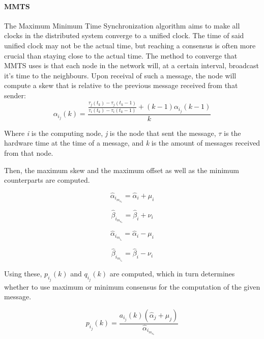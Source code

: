 \documentclass[a4paper,12pt]{article}
\begin{document}
    \paragraph{MMTS} The Maximum Minimum Time Synchronization algorithm aims to make all clocks in the distributed system converge to a unified clock. The time of said unified clock may not be the actual time, but reaching a consensus is often more crucial than staying close to the actual time.
    The method to converge that MMTS uses is that each node in the network will, at a certain interval, broadcast it's time to the neighbours. Upon receival of such a message, the node will compute a skew that is relative to the previous message received from that sender:
    \begin{equation}
        \alpha_i_j(k) = \frac{\frac{\tau_j(t_k) - \tau_j(t_k - 1)}{\tau_i(t_k)-\tau_i(t_k-1)} + (k-1)\alpha_i_j(k-1)}{k}
    \end{equation}

    Where \textit{i} is the computing node, \textit{j} is the node that sent the message, \textit{$\tau$} is the hardware time at the time of a message, and \textit{k} is the amount of messages received from that node.
    
    Then, the maximum skew and the maximum offset as well as the minimum counterparts are computed.
    
    \begin{equation}
        \hat{\alpha}_i_m_a_x = \hat{\alpha}_i + \mu_i
    \end{equation}
    
    \begin{equation}
        \hat{\beta}_i_m_a_x = \hat{\beta}_i + \nu_i
    \end{equation}
    
    \begin{equation}
        \hat{\alpha}_i_m_i_n = \hat{\alpha}_i - \mu_i
    \end{equation}
    
    \begin{equation}
        \hat{\beta}_i_m_i_n = \hat{\beta}_i - \nu_i
    \end{equation}
    
    Using these, $p_i_j(k)$ and $q_i_j(k)$ are computed, which in turn determines whether to use maximum or minimum consensus for the computation of the given message.
    
    \begin{equation}
        p_i_j(k) = \frac{a_i_j(k)(\hat{\alpha}_j + \mu_j)}{\hat{\alpha}_i_m_a_x}
    \end{equation}
    
\end{document}
